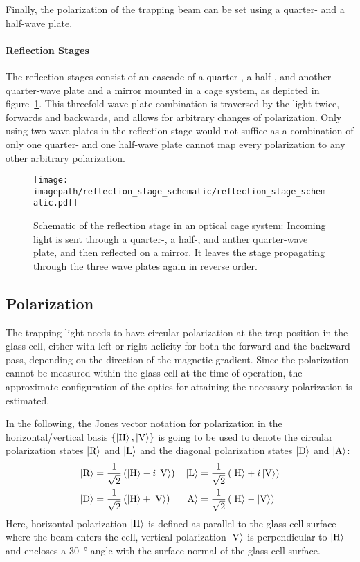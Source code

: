Finally, the polarization of the trapping beam can be set using a quarter- and a half-wave plate.

\paragraph{Reflection Stages}
The reflection stages consist of an cascade of a quarter-, a half-, and another quarter-wave plate and a mirror mounted in a cage system, as depicted in figure~\ref{fig:reflection_stage_schematic}. This threefold wave plate combination is traversed by the light twice, forwards and backwards, and allows for arbitrary changes of polarization. Only using two wave plates in the reflection stage would not suffice as a combination of only one quarter- and one half-wave plate cannot map every polarization to any other arbitrary polarization.

\begin{figure}
    \centering
    \texttt{[image: \\imagepath/reflection\_stage\_schematic/reflection\_stage\_schematic.pdf]}
    \caption{Schematic of the reflection stage in an optical cage system: Incoming light is sent through a quarter-, a half-, and anther quarter-wave plate, and then reflected on a mirror. It leaves the stage propagating through the three wave plates again in reverse order.}
    \label{fig:reflection_stage_schematic}
\end{figure}

\subsection*{Polarization}
The trapping light needs to have circular polarization at the trap position in the glass cell, either with left or right helicity for both the forward and the backward pass, depending on the direction of the magnetic gradient. Since the polarization cannot be measured within the glass cell at the time of operation, the approximate configuration of the optics for attaining the necessary polarization is estimated.

In the following, the Jones vector notation for polarization in the horizontal/vertical basis $\{\Ket{\text{H}}, \Ket{\text{V}}\}$ is going to be used to denote the circular polarization states $\Ket{\text{R}}$ and $\Ket{\text{L}}$ and the diagonal polarization states $\Ket{\text{D}}$ and $\Ket{\text{A}}$:
\begin{align}
        \Ket{\text{R}} &= \frac{1}{\sqrt{2}} \left(\Ket{\text{H}} - i \Ket{\text{V}}\right)  & \Ket{\text{L}} &= \frac{1}{\sqrt{2}} \left(\Ket{\text{H}} + i \Ket{\text{V}}\right) \\
        \Ket{\text{D}} &= \frac{1}{\sqrt{2}} \left(\Ket{\text{H}} + \Ket{\text{V}}\right)  &  \Ket{\text{A}} &= \frac{1}{\sqrt{2}} \left(\Ket{\text{H}} - \Ket{\text{V}}\right)
\end{align}
Here, horizontal polarization $\Ket{\text{H}}$ is defined as parallel to the glass cell surface  where the beam enters the cell, vertical polarization $\Ket{\text{V}}$ is perpendicular to $\Ket{\text{H}}$ and encloses a \SI{30}{\degree} angle with the surface normal of the glass cell surface.

